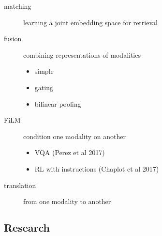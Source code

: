\documentclass[]{article}
\theoremstyle{definition}
\begin{document}
    \begin{description}
        \item[matching] learning a joint embedding space for retrieval
        \item[fusion] combining representations of modalities
            \begin{itemize}
                \item simple
                \item gating
                \item bilinear pooling
            \end{itemize}
        \item[FiLM] condition one modality on another
            \begin{itemize}
                \item VQA (Perez et al 2017)
                \item RL with instructions (Chaplot et al 2017)
            \end{itemize}
        \item[translation] from one modality to another
    \end{description}

    \subsection{Research}%
    \label{sub:research}
\end{document}
